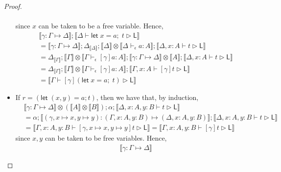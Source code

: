 \documentclass[acmsmall,screen,review]{acmart}
\newcommand{\ms}[1]{\ensuremath{\mathsf{#1}}}
\newcommand{\letexpr}[3]{\ensuremath{\ms{let}\;#1 = #2;\;#3}}
\newcommand{\letstmt}[3]{\ensuremath{\ms{let}\;#1 = #2; #3}}
\newcommand{\bhyp}[2]{#1 : #2}
\newcommand{\hasty}[4]{#1 \vdash_{#2} #3: {#4}}
\newcommand{\haslb}[3]{#1 \vdash #2 \rhd #3}
\newcommand{\issubst}[3]{#1: #2 \mapsto #3}
\newcommand{\dnt}[1]{\llbracket{#1}\rrbracket}
\begin{document}
\begin{proof}
\begin{itemize}[leftmargin=*]
\begin{equation}
\begin{aligned}
      \end{aligned}
    \end{equation}
    since $x$ can be taken to be a free variable. Hence,
    \begin{equation}
      \begin{aligned}
        & \dnt{\issubst{\gamma}{\Gamma}{\Delta}} 
        ; \dnt{\haslb{\Delta}{\letexpr{x}{a}{t}}{\ms{L}}} \\
        &= \dnt{\issubst{\gamma}{\Gamma}{\Delta}}
        ; \Delta_{\dnt{\Delta}} ; \dnt{\Delta} \otimes \dnt{\hasty{\Delta}{\epsilon}{a}{A}}
        ; \dnt{\haslb{\Delta, \bhyp{x}{A}}{t}{\ms{L}}} \\
        &= \Delta_{\dnt{\Gamma}} 
        ; \dnt{\Gamma} 
          \otimes \dnt{\hasty{\Gamma}{\epsilon}{[\gamma]a}{A}}
        ; \dnt{\issubst{\gamma}{\Gamma}{\Delta}} \otimes \dnt{A}
        ; \dnt{\haslb{\Delta, \bhyp{x}{A}}{t}{\ms{L}}} \\
        &= \Delta_{\dnt{\Gamma}}
        ; \dnt{\Gamma} \otimes \dnt{\hasty{\Gamma}{\epsilon}{[\gamma]a}{A}}
        ; \dnt{\haslb{\Gamma, \bhyp{x}{A}}{[\gamma]t}{\ms{L}}} \\
        &= \dnt{\haslb{\Gamma}{[\gamma](\letexpr{x}{a}{t})}{\ms{L}}}
      \end{aligned}
    \end{equation}
    \item If $r = (\letstmt{(x, y)}{a}{t})$, then we have that, by induction,
    \begin{equation}
      \begin{aligned}
      & \dnt{\issubst{\gamma}{\Gamma}{\Delta}} \otimes (\dnt{A} \otimes \dnt{B}) 
          ; \alpha ; \dnt{\haslb{\Delta, \bhyp{x}{A}, \bhyp{y}{B}}{t}{\ms{L}}}
      \\ &= \alpha ; \dnt{\issubst{(\gamma, x \mapsto x, y \mapsto y)}
        {(\Gamma, \bhyp{x}{A}, \bhyp{y}{B})}{(\Delta, \bhyp{x}{A}, \bhyp{y}{B})}}
          ; \dnt{\haslb{\Delta, \bhyp{x}{A}, \bhyp{y}{B}}{t}{\ms{L}}}
      \\ &= \dnt{\haslb{\Gamma, \bhyp{x}{A}, \bhyp{y}{B}}
                        {[\gamma, x \mapsto x, y \mapsto y]t}{\ms{L}}}
          = \dnt{\haslb{\Gamma, \bhyp{x}{A}, \bhyp{y}{B}}{[\gamma]t}{\ms{L}}}
      \end{aligned}
    \end{equation}
    since $x, y$ can be taken to be free variables. Hence,
    \begin{equation}
      \begin{aligned}
        & \dnt{\issubst{\gamma}{\Gamma}{\Delta}} 

\end{aligned}
\end{equation}
\end{itemize}
\end{proof}
\end{document}
